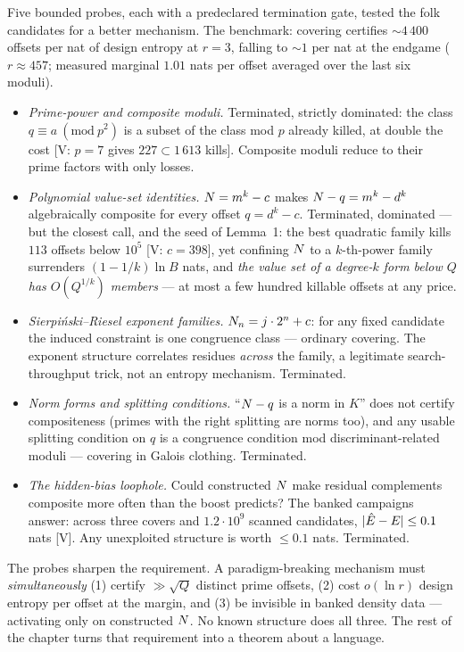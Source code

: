 Five bounded probes, each with a predeclared termination gate, tested
the folk candidates for a better mechanism. The benchmark: covering
certifies $\sim$$4\,400$ offsets per nat of design entropy at $r=3$,
falling to $\sim$$1$ per nat at the endgame ($r\approx457$; measured
marginal $1.01$ nats per offset averaged over the last six moduli).

\begin{itemize}
\item[\textbf{P1}] \emph{Prime-power and composite moduli.} Terminated,
strictly dominated: the class $q\equiv a\ (\mathrm{mod}\ p^2)$ is a
subset of the class mod $p$ already killed, at double the cost
[V: $p=7$ gives $227\subset1\,613$ kills]. Composite moduli reduce to
their prime factors with only losses.
\item[\textbf{P2}] \emph{Polynomial value-set identities.} $N=m^k-c$
makes $N-q=m^k-d^k$ algebraically composite for every offset
$q=d^k-c$. Terminated, dominated --- but the closest call, and the
seed of Lemma~1: the best quadratic family kills $113$ offsets below
$10^5$ [V: $c=398$], yet confining $N$ to a $k$-th-power family
surrenders $(1-1/k)\ln B$ nats, and \emph{the value set of a
degree-$k$ form below $Q$ has $O(Q^{1/k})$ members} --- at most a few
hundred killable offsets at any price.
\item[\textbf{P3}] \emph{Sierpi\'nski--Riesel exponent families.}
$N_n=j\cdot2^n+c$: for any fixed candidate the induced constraint is
one congruence class --- ordinary covering. The exponent structure
correlates residues \emph{across} the family, a legitimate
search-throughput trick, not an entropy mechanism. Terminated.
\item[\textbf{P4}] \emph{Norm forms and splitting conditions.} ``$N-q$
is a norm in $K$'' does not certify compositeness (primes with the
right splitting are norms too), and any usable splitting condition on
$q$ is a congruence condition mod discriminant-related moduli ---
covering in Galois clothing. Terminated.
\item[\textbf{P5}] \emph{The hidden-bias loophole.} Could constructed
$N$ make residual complements composite more often than the boost
predicts? The banked campaigns answer: across three covers and
$1.2\cdot10^9$ scanned candidates, $|\hat{E}-E|\le0.1$ nats [V].
Any unexploited structure is worth $\le0.1$ nats. Terminated.
\end{itemize}

The probes sharpen the requirement. A paradigm-breaking mechanism must
\emph{simultaneously} (1) certify $\gg\sqrt Q$ distinct prime offsets,
(2) cost $o(\ln r)$ design entropy per offset at the margin, and (3) be
invisible in banked density data --- activating only on constructed
$N$. No known structure does all three. The rest of the chapter turns
that requirement into a theorem about a language.

